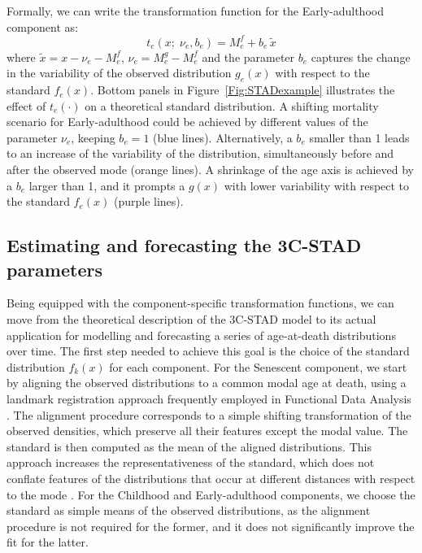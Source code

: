 \documentclass[11pt, a4paper]{article}
\begin{document}
Formally, we can write the transformation function for the Early-adulthood component as:
%
\begin{equation}\label{Eq:STADacc}
t_{e}(x;\;\nu_{e}, b_{e}) =  M_{e}^{f} + b_{e} \, \tilde{x} 
\end{equation} 
%
where $\tilde{x} = x - \nu_{e} - M_{e}^{f}$, $\nu_{e} = M_{e}^{g} - M_{e}^{f}$ and the parameter $b_{e}$ captures the change in the variability of the observed distribution $g_{e}(x)$ with respect to the standard $f_{e}(x)$. Bottom panels in Figure~\ref{Fig:STADexample} illustrates the effect of $t_{e}(\cdot)$ on a theoretical standard distribution. A shifting mortality scenario for Early-adulthood could be achieved by different values of the parameter $\nu_{e}$, keeping $b_{e}=1$ (blue lines). Alternatively, a $b_{e}$ smaller than 1 leads to an increase of the variability of the distribution, simultaneously before and after the observed mode (orange lines). A shrinkage of the age axis is achieved by a $b_{e}$ larger than 1, and it prompts a $g(x)$ with lower variability with respect to the standard $f_{e}(x)$ (purple lines). 



\subsection{Estimating and forecasting the 3C-STAD parameters}\label{Subsec:STADforecast}

Being equipped with the component-specific transformation functions, we can move from the theoretical description of the 3C-STAD model to its actual application for modelling and forecasting a series of age-at-death distributions over time. The first step needed to achieve this goal is the choice of the standard distribution $f_{k}(x)$ for each component. For the Senescent component, {\color{red}we start by aligning the observed distributions to a common modal age at death, using a landmark registration approach frequently employed in Functional Data Analysis \citep{ramsay2005FDA}. The alignment procedure corresponds to a simple shifting transformation of the observed densities, which preserve all their features except the modal value. The standard is then computed as the mean of the aligned distributions. This approach increases the representativeness of the standard, which does} not conflate features of the distributions that occur at different distances with respect to the mode \cite[{\color{red}for additional details and an explicative illustration,} see][{\color{red}pp.~122--124}]{basellini2019stad}. For the Childhood and Early-adulthood components, we choose the standard as simple means of the observed distributions, as the alignment procedure is not required for the former, and it does not significantly improve the fit for the latter. 
\end{document}
